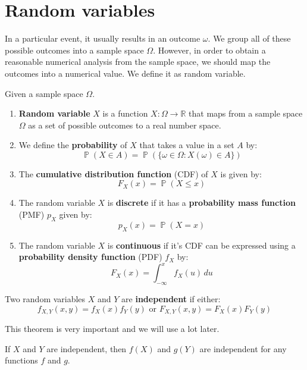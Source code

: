\documentclass{huhtakm-template-book-v2}
\DeclareMathOperator{\prob}{\mathbb{P}}
\begin{document}
\section{Random variables}
In a particular event, it usually results in an outcome $\omega$. We group all of these possible outcomes into a sample space $\Omega$. However, in order to obtain a reasonable numerical analysis from the sample space, we should map the outcomes into a numerical value. We define it as random variable.
\begin{defn}
	Given a sample space $\Omega$.
	\begin{enumerate}
		\item \textbf{Random variable} $X$ is a function $X:\Omega\to\mathbb{R}$ that maps from a sample space $\Omega$ as a set of possible outcomes to a real number space.
		\item We define the \textbf{probability} of $X$ that takes a value in a set $A$ by:
		\begin{equation*}
			\prob(X\in A)=\prob(\{\omega\in\Omega: X(\omega)\in A\})
		\end{equation*}
		\item The \textbf{cumulative distribution function} (CDF) of $X$ is given by:
		\begin{equation*}
			F_{X}(x)=\prob(X\leq x)
		\end{equation*}
		\item The random variable $X$ is \textbf{discrete} if it has a \textbf{probability mass function} (PMF) $p_{X}$ given by:
		\begin{equation*}
			p_{X}(x)=\prob(X=x)
		\end{equation*}
		\item The random variable $X$ is \textbf{continuous} if it's  CDF can be expressed using a \textbf{probability density function} (PDF) $f_{X}$ by:
		\begin{equation*}
			F_{X}(x)=\int_{-\infty}^{x}f_{X}(u)\,du
		\end{equation*}
	\end{enumerate}
\end{defn}
\begin{defn}
	Two random variables $X$ and $Y$ are \textbf{independent} if either:
	\begin{equation*}
		f_{X,Y}(x,y)=f_{X}(x)f_{Y}(y)\text{ or }F_{X,Y}(x,y)=F_{X}(x)F_{Y}(y)
	\end{equation*}
\end{defn}
This theorem is very important and we will use a lot later.
\begin{thm}
	If $X$ and $Y$ are independent, then $f(X)$ and $g(Y)$ are independent for any functions $f$ and $g$.
\end{thm}
\end{document}
